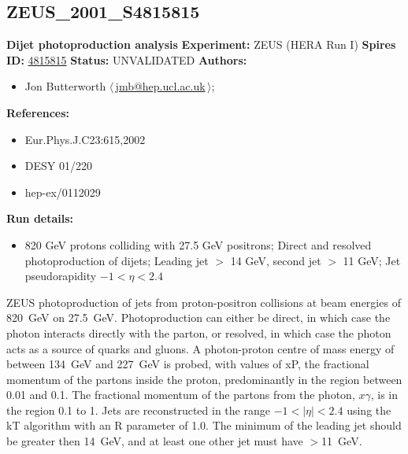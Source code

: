 \clearpage


\clearpage

\subsection[ZEUS\_2001\_S4815815]{ZEUS\_2001\_S4815815\,\cite{Chekanov:2001bw}}
\textbf{Dijet photoproduction analysis}\newline
\textbf{Experiment:} ZEUS (HERA Run I) \newline
\textbf{Spires ID:} \href{http://www.slac.stanford.edu/spires/find/hep/www?rawcmd=key+4815815}{4815815}\newline
\textbf{Status:} UNVALIDATED\newline
\textbf{Authors:}
\begin{itemize}
  \item Jon Butterworth $\langle\,$\href{mailto:jmb@hep.ucl.ac.uk}{jmb@hep.ucl.ac.uk}$\,\rangle$;
\end{itemize}
\textbf{References:}
\begin{itemize}
  \item Eur.Phys.J.C23:615,2002
  \item DESY 01/220
  \item hep-ex/0112029
\end{itemize}
\textbf{Run details:}
\begin{itemize}

  \item 820 GeV protons colliding with 27.5 GeV positrons; Direct and resolved photoproduction of dijets; Leading jet \pT $>$ 14 GeV, second jet \pT $>$ 11 GeV; Jet pseudorapidity $-1 < \eta < 2.4$\end{itemize}

\noindent ZEUS photoproduction of jets from proton-positron collisions at beam energies of 820~GeV on 27.5~GeV. Photoproduction can either be direct, in which case the photon interacts directly with the parton, or resolved, in which case the photon acts as a source of quarks and gluons. A photon-proton centre of mass energy of between 134~GeV and 227~GeV is probed, with values of xP, the fractional momentum of the partons inside the proton, predominantly in the region between 0.01 and 0.1. The fractional momentum of the partons from the photon, $x\gamma$, is in the region 0.1 to 1. Jets are reconstructed in the range $-1<|\eta|<2.4$ using the kT algorithm with an R parameter of 1.0. The minimum \pT of the leading jet should be greater then 14~GeV, and at least one other jet must have \pT$>$11~GeV.

